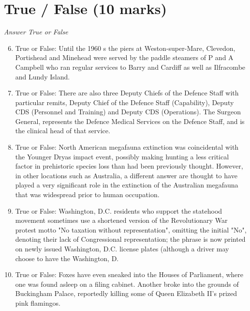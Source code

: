 \documentclass[12pt]{article}
\begin{document}
\section*{True / False (10 marks)}
\textit{Answer True or False}
\begin{enumerate}[label=\arabic*.]
\setcounter{enumi}{5}
\item True or False: Until the 1960 s the piers at Weston-super-Mare, Clevedon, Portishead and Minehead were served by the paddle steamers of P and A Campbell who ran regular services to Barry and Cardiff as well as Ilfracombe and Lundy Island.
\item True or False: There are also three Deputy Chiefs of the Defence Staff with particular remits, Deputy Chief of the Defence Staff (Capability), Deputy CDS (Personnel and Training) and Deputy CDS (Operations). The Surgeon General, represents the Defence Medical Services on the Defence Staff, and is the clinical head of that service.
\item True or False: North American megafauna extinction was coincidental with the Younger Dryas impact event, possibly making hunting a less critical factor in prehistoric species loss than had been previously thought. However, in other locations such as Australia, a different answer are thought to have played a very significant role in the extinction of the Australian megafauna that was widespread prior to human occupation.
\item True or False: Washington, D.C. residents who support the statehood movement sometimes use a shortened version of the Revolutionary War protest motto "No taxation without representation", omitting the initial "No", denoting their lack of Congressional representation; the phrase is now printed on newly issued Washington, D.C. license plates (although a driver may choose to have the Washington, D.
\item True or False: Foxes have even sneaked into the Houses of Parliament, where one was found asleep on a filing cabinet. Another broke into the grounds of Buckingham Palace, reportedly killing some of Queen Elizabeth II's prized pink flamingos.
\end{enumerate}
\end{document}
